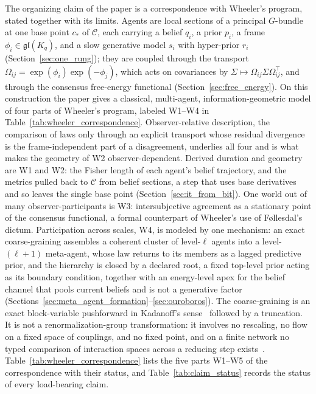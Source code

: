 \documentclass[11pt]{article}
\begin{document}
The organizing claim of the paper is a correspondence with Wheeler's program, stated together with its limits. Agents are local sections of a principal $G$-bundle at one base point $c_*$ of $\mathcal{C}$, each carrying a belief $q_i$, a prior $p_i$, a frame $\phi_i \in \mathfrak{gl}(K_q)$, and a slow generative model $s_i$ with hyper-prior $r_i$ (Section~\ref{sec:one_rung}); they are coupled through the transport $\Omega_{ij} = \exp(\phi_i)\exp(-\phi_j)$, which acts on covariances by $\Sigma \mapsto \Omega_{ij}\Sigma\Omega_{ij}^\top$, and through the consensus free-energy functional (Section~\ref{sec:free_energy}). On this construction the paper gives a classical, multi-agent, information-geometric model of four parts of Wheeler's program, labeled W1--W4 in Table~\ref{tab:wheeler_correspondence}. Observer-relative description, the comparison of laws only through an explicit transport whose residual divergence is the frame-independent part of a disagreement, underlies all four and is what makes the geometry of W2 observer-dependent. Derived duration and geometry are W1 and W2: the Fisher length of each agent's belief trajectory, and the metrics pulled back to $\mathcal{C}$ from belief sections, a step that uses base derivatives and so leaves the single base point (Section~\ref{sec:it_from_bit}). One world out of many observer-participants is W3: intersubjective agreement as a stationary point of the consensus functional, a formal counterpart of Wheeler's use of F{\o}llesdal's dictum. Participation across scales, W4, is modeled by one mechanism: an exact coarse-graining assembles a coherent cluster of level-$\ell$ agents into a level-$(\ell+1)$ meta-agent, whose law returns to its members as a lagged predictive prior, and the hierarchy is closed by a declared root, a fixed top-level prior acting as its boundary condition, together with an energy-level apex for the belief channel that pools current beliefs and is not a generative factor (Sections~\ref{sec:meta_agent_formation}--\ref{sec:ouroboros}). The coarse-graining is an exact block-variable pushforward in Kadanoff's sense~\cite{kadanoff1966scaling, Kadanoff1975, KadanoffHoughtonYalabik1976} followed by a truncation. It is not a renormalization-group transformation: it involves no rescaling, no flow on a fixed space of couplings, and no fixed point, and on a finite network no typed comparison of interaction spaces across a reducing step exists~\cite[Ch.~11]{DennisGaugeVFE2026}. Table~\ref{tab:wheeler_correspondence} lists the five parts W1--W5 of the correspondence with their status, and Table~\ref{tab:claim_status} records the status of every load-bearing claim.
\end{document}
